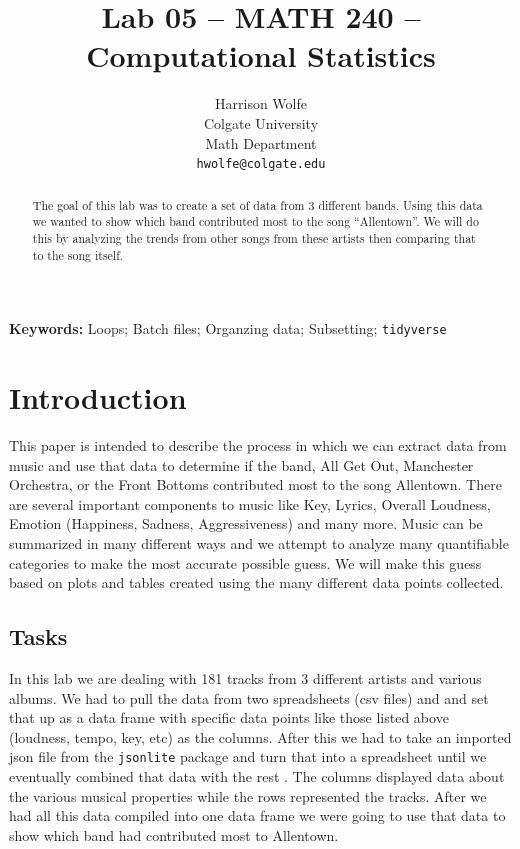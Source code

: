 \documentclass{article}\usepackage[]{graphicx}\usepackage[]{xcolor}
\begin{document}
\vspace{-1in}
\title{Lab 05 -- MATH 240 -- Computational Statistics}

\author{
  Harrison Wolfe \\
  Colgate University  \\
  Math Department\\
  {\tt hwolfe@colgate.edu}
}

\date{}

\maketitle

\begin{multicols}{2}
\begin{abstract}

The goal of this lab was to create a set of data
from 3 different bands. Using this data we wanted to
show which band contributed most to the song ``Allentown”.
We will do this by analyzing the trends from
other songs from these artists then comparing that to
the song itself.
\end{abstract}

\noindent \textbf{Keywords:} Loops; Batch files; Organzing data; Subsetting; \texttt{tidyverse}

\section{Introduction}

This paper is intended to describe the process in which we can extract data from music and use that data to determine if the band, All Get Out, Manchester Orchestra, or the Front Bottoms contributed most to the song Allentown. There are several important components to music like Key, Lyrics, Overall Loudness, Emotion (Happiness, Sadness, Aggressiveness) and many more. Music can be summarized in many different ways and we attempt to analyze many quantifiable categories to make the most accurate possible guess. We will make this guess based on plots and tables created using the many different data points collected.
\subsection{Tasks}
In this lab we are dealing with 181 tracks from 3 different
artists and various albums. We had to pull the data from
two spreadsheets (csv files) and and set that up as a data frame
with specific data points like those listed above (loudness,
tempo, key, etc) as the columns. After this we had to take an imported json file from the \texttt{jsonlite} package and turn that into a spreadsheet until we eventually combined that data with the rest \citep{jsonlite}. The columns displayed data about the various musical properties while the rows represented the tracks. After we had all
this data compiled into one data frame we were going to use
that data to show which band had contributed most to Allentown. 




\end{multicols}
\end{document}
